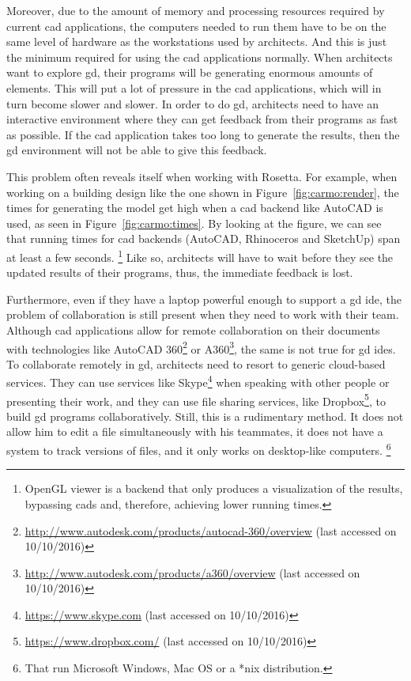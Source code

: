 Moreover, due to the amount of memory and processing resources required by current \gls{cad} applications, the computers needed to run them have to be on the same level of hardware as the workstations used by architects.
And this is just the minimum required for using the \gls{cad} applications normally.
When architects want to explore \gls{gd}, their programs will be generating enormous amounts of elements.
This will put a lot of pressure in the \gls{cad} applications, which will in turn become slower and slower.
In order to do \gls{gd}, architects need to have an interactive environment where they can get feedback from their programs as fast as possible.
If the \gls{cad} application takes too long to generate the results, then the \gls{gd} environment will not be able to give this feedback.

This problem often reveals itself when working with Rosetta.
For example, when working on a building design like the one shown in Figure~\ref{fig:carmo:render}, the times for generating the model get high when a \gls{cad} backend like AutoCAD is used, as seen in Figure~\ref{fig:carmo:times}.
By looking at the figure, we can see that running times for \gls{cad} backends (AutoCAD, Rhinoceros and SketchUp) span at least a few seconds.%
\footnote{OpenGL viewer is a backend that only produces a visualization of the results, bypassing \glspl{cad} and, therefore, achieving lower running times.}
Like so, architects will have to wait before they see the updated results of their programs, thus, the immediate feedback is lost.

Furthermore, even if they have a laptop powerful enough to support a \gls{gd} \gls{ide}, the problem of collaboration is still present when they need to work with their team.
Although \gls{cad} applications allow for remote collaboration on their documents with technologies like AutoCAD 360\footnote{\url{http://www.autodesk.com/products/autocad-360/overview} (last accessed on 10/10/2016)} or A360\footnote{\url{http://www.autodesk.com/products/a360/overview} (last accessed on 10/10/2016)}, the same is not true for \gls{gd} \glspl{ide}.
To collaborate remotely in \gls{gd}, architects need to resort to generic cloud-based services.
They can use services like Skype\footnote{\url{https://www.skype.com} (last accessed on 10/10/2016)} when speaking with other people or presenting their work, and they can use file sharing services, like Dropbox\footnote{\url{https://www.dropbox.com/} (last accessed on 10/10/2016)}, to build \gls{gd} programs collaboratively.
Still, this is a rudimentary method.
It does not allow him to edit a file simultaneously with his teammates, it does not have a system to track versions of files, and it only works on desktop-like computers.%
\footnote{That run Microsoft Windows, Mac OS or a *nix distribution.}

